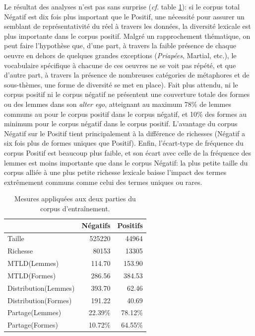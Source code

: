 Le résultat des analyses n'est pas sans surprise (\textit{cf.} table \ref{tab:chap4:mesures-corpora}): si le corpus total Négatif est dix fois plus important que le Positif, une nécessité pour assurer un semblant de représentativité du réel à travers les données, la diversité lexicale est plus importante dans le corpus positif. Malgré un rapprochement thématique, on peut faire l'hypothèse que, d'une part, à travers la faible présence de chaque oeuvre en dehors de quelques grandes exceptions (\textit{Priapées}, Martial, etc.), le vocabulaire spécifique à chacune de ces oeuvres ne se voit pas répété, et que d'autre part, à travers la présence de nombreuses catégories de métaphores et de sous-thèmes, une forme de diversité se met en place). Fait plus attendu, ni le corpus positif ni le corpus négatif ne présentent une couverture totale des formes ou des lemmes dans son \textit{alter ego}, atteignant au maximum 78\% de lemmes communs au pour le corpus positif dans le corpus négatif, et 10\% des formes au minimum pour le corpus négatif dans le corpus positif. L'avantage du corpus Négatif sur le Positif tient principalement à la différence de richesses (Négatif a six fois plus de formes uniques que Positif). Enfin, l'écart-type de fréquence du corpus Positif est beaucoup plus faible, et son écart avec celle de la fréquence des lemmes est moins importante que dans le corpus Négatif: la plus petite taille du corpus alliée à une plus petite richesse lexicale baisse l'impact des termes extrêmement communs comme celui des termes uniques ou rares.

\begin{table}[ht]
    \centering
    \begin{tabular}{l|rr}
    \toprule
    {} &  Négatifs &  Positifs \\
    \midrule
    Taille               & 525220    &  44964    \\
    Richesse             &  80153    &  13305    \\
    MTLD(Lemmes)         &    114.70 &    153.90 \\
    MTLD(Formes)         &    286.56 &    384.53 \\
    Distribution(Lemmes) &    393.70 &     62.46 \\
    Distribution(Formes) &    191.22 &     40.69 \\
    Partage(Lemmes)      &   22.39\% &   78.12\% \\
    Partage(Formes)      &   10.72\% &   64.55\% \\
    \bottomrule
    \end{tabular}
    \caption{Mesures appliquées aux deux parties du corpus d'entraînement.}
    \label{tab:chap4:mesures-corpora}
\end{table}

